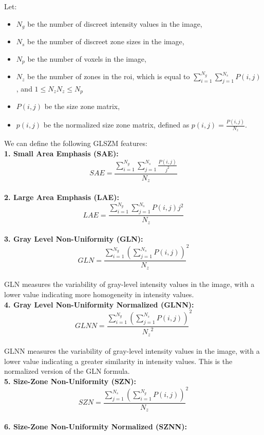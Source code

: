 Let:
\begin{itemize}
\item $N_{g}$ be the number of discreet intensity values in the image, 
\item $N_{s}$ be the number of discreet zone sizes in the image,
\item $N_{p}$ be the number of voxels in the image,
\item $N_{z}$ be the number of zones in the \ac{roi}, which is equal to $\sum _{i=1}^{N_{g}}\sum _{j=1}^{N_{s}}P\left(i,j\right)$, and $1\leq N_{z}N_{z}\leq N_{p}$
\item $P\left(i,j\right)$ be the size zone matrix,
\item $p\left(i,j\right)$ be the normalized size zone matrix, defined as $p\left(i,j\right)=\frac{P\left(i,j\right)}{N_{z}}$.
\end{itemize}
We can define the following GLSZM features:\\
\textbf{1. Small Area Emphasis (SAE):}\\
\[SAE=\frac{\sum _{i=1}^{N_{g}}\sum _{j=1}^{N_{s}}\frac{P\left(i,j\right)}{j^{2}}}{N_{z}}\]\\
\textbf{2. Large Area Emphasis (LAE):}\\
\[LAE=\frac{\sum _{i=1}^{N_{g}}\sum _{j=1}^{N_{s}}P\left(i,j\right)j^{2}}{N_{z}}\]\\
\textbf{3. Gray Level Non-Uniformity (GLN):}\\
\[GLN=\frac{\sum _{i=1}^{N_{g}}\left(\sum _{j=1}^{N_{s}}P\left(i,j\right)\right)}{N_{z}}^{2}\]\\
GLN measures the variability of gray-level intensity values in the image, with a lower value indicating more homogeneity in intensity values.\\
\textbf{4. Gray Level Non-Uniformity Normalized (GLNN):}\\
\[GLNN=\frac{\sum _{i=1}^{N_{g}}\left(\sum _{j=1}^{N_{s}}P\left(i,j\right)\right)}{{N_{z}}^{2}}^{2}\]\\
GLNN measures the variability of gray-level intensity values in the image, with a lower value indicating a greater similarity in intensity values. This is the normalized version of the GLN formula.\\
\textbf{5. Size-Zone Non-Uniformity (SZN):}\\
\[SZN=\frac{\sum _{j=1}^{N_{s}}\left(\sum _{i=1}^{N_{g}}P\left(i,j\right)\right)}{N_{z}}^{2}\]\\
\textbf{6. Size-Zone Non-Uniformity Normalized (SZNN):}\\
